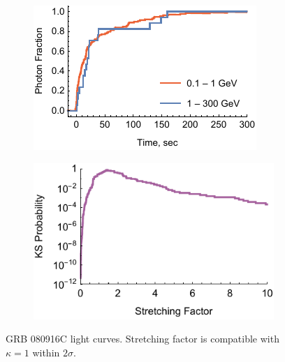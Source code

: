 \documentclass[manuscript]{aastex}
\begin{document}
\begin{figure}
        \centering
        \begin{subfigure}{0.49\textwidth}
                \includegraphics[width=\textwidth]{lightCurve080916C}
                \label{fig:lightCurve080916C}
        \end{subfigure}
        \begin{subfigure}{0.49\textwidth}
                \includegraphics[width=\textwidth]{probabilities080916C}
                \label{fig:probabilities080916C}
        \end{subfigure}
        \caption{GRB 080916C light curves. Stretching factor is compatible with $\kappa = 1$ within $2\sigma$.}
        \label{fig:grb080916C}
\end{figure}
\end{document}
